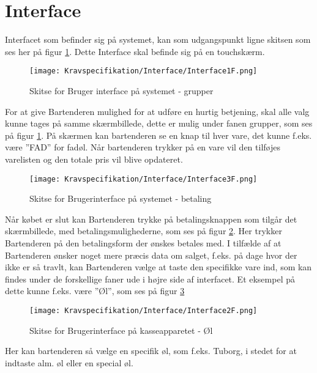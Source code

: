 \section{Interface}
Interfacet som befinder sig på systemet, kan som udgangspunkt ligne skitsen som ses her på figur \ref{fig:Interface1}. Dette Interface skal befinde sig på en touchskærm.

\begin{figure}[ht]
	\centering
	\texttt{[image: Kravspecifikation/Interface/Interface1F.png]}
	\caption{Skitse for Bruger interface på systemet - grupper}
	\label{fig:Interface1}
\end{figure}

For at give Bartenderen mulighed for at udføre en hurtig betjening, skal alle valg kunne tages på samme skærmbillede, dette er mulig under fanen grupper, som ses på figur \ref{fig:Interface1}. 
\newline\newline
På skærmen kan bartenderen se en knap til hver vare, det kunne f.eks. være ''FAD'' for fadøl. Når bartenderen trykker på en vare vil den tilføjes varelisten og den totale pris vil blive opdateret. 

\begin{figure}[H]
	\centering
	\texttt{[image: Kravspecifikation/Interface/Interface3F.png]}
	\caption{Skitse for Brugerinterface på systemet - betaling}
	\label{fig:Interface3}
\end{figure}
Når købet er slut kan Bartenderen trykke på betalingsknappen som tilgår det skærmbillede, med betalingsmulighederne, som ses på figur \ref{fig:Interface3}. Her trykker Bartenderen på den betalingsform der ønskes betales med. 
\newpage
I tilfælde af at Bartenderen ønsker noget mere præcis data om salget, f.eks. på dage hvor der ikke er så travlt, kan Bartenderen vælge at taste den specifikke vare ind, som kan findes under de forskellige faner ude i højre side af interfacet. Et eksempel på dette kunne f.eks. være ''Øl'', som ses på figur \ref{fig:Interface2}

\begin{figure}[ht]
	\centering
	\texttt{[image: Kravspecifikation/Interface/Interface2F.png]}
	\caption{Skitse for Brugerinterface på kasseapparetet - Øl}
	\label{fig:Interface2}
\end{figure}

Her kan bartenderen så vælge en specifik øl, som f.eks. Tuborg, i stedet for at indtaste alm. øl eller en special øl.

